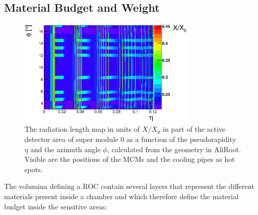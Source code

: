 \documentclass{alicetdr}
\begin{document}
\subsection{Material Budget and Weight}
%
\begin{figure}[htb]
\begin{center}
\includegraphics[width=0.75\textwidth]{plots/geo_material_budget.eps}
\end{center}
\caption{
The radiation length map in units of $X/X_{0}$ in part of the active
detector area of super module 0 as a function of the pseudorapidity
$\eta$ and the azimuth angle $\phi$, calculated from the geometry in
AliRoot.  Visible are the positions of the MCMs and the cooling pipes
as hot spots.
}
\label{FIG_GEO:mat_budget}
\end{figure}
%
The volumina defining a ROC contain several layers that represent the
different materials present inside a chamber and which therefore define
the material budget inside the sensitive areas:
\end{document}
